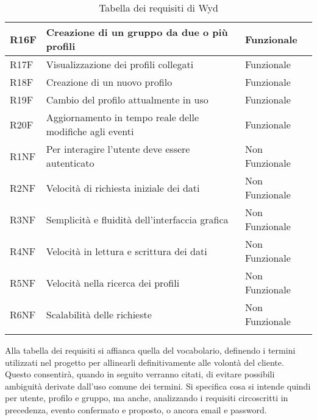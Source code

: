 \begin{longtable} {|P{1.3cm}|P{11.2cm}|P{3cm}|}
    \hline
    R16F        & Creazione di un gruppo da due o più profili                                & Funzionale     \\
    \hline
    R17F        & Visualizzazione dei profili collegati                                      & Funzionale     \\
    \hline
    R18F        & Creazione di un nuovo profilo                                              & Funzionale     \\
    \hline
    R19F        & Cambio del profilo attualmente in uso                                      & Funzionale     \\
    \hline
    R20F        & Aggiornamento in tempo reale delle modifiche agli eventi                   & Funzionale     \\
    \hline
    R1NF        & Per interagire l'utente deve essere autenticato                            & Non Funzionale \\
    \hline
    R2NF        & Velocità di richiesta iniziale dei dati                                    & Non Funzionale \\
    \hline
    R3NF        & Semplicità e fluidità dell'interfaccia grafica                             & Non Funzionale \\
    \hline
    R4NF        & Velocità in lettura e scrittura dei dati                                   & Non Funzionale \\
    \hline
    R5NF        & Velocità nella ricerca dei profili                                         & Non Funzionale \\
    \hline
    R6NF        & Scalabilità delle richieste                                                & Non Funzionale \\
    \hline
    \caption{Tabella dei requisiti di Wyd}
\end{longtable}


Alla tabella dei requisiti si affianca quella del vocabolario,
definendo i termini utilizzati nel progetto per allinearli definitivamente alle volontà del cliente.
Questo consentirà, quando in seguito verranno citati,
di evitare possibili ambiguità derivate dall'uso comune dei termini.
Si specifica cosa si intende quindi per utente, profilo e gruppo, ma anche,
analizzando i requisiti circoscritti in precedenza,
evento confermato e proposto, o ancora email e password.
\\

